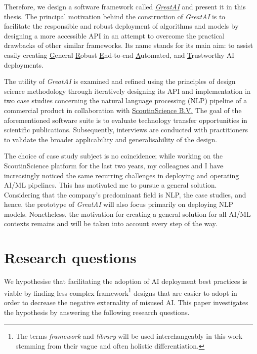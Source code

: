 Therefore, we design a software framework called \href{https://github.com/schmelczer/great-ai}{\textit{GreatAI}} and present it in this thesis. The principal motivation behind the construction of \textit{GreatAI} is to facilitate the responsible and robust deployment of algorithms and models by designing a more accessible API in an attempt to overcome the practical drawbacks of other similar frameworks. Its name stands for its main aim: to assist easily creating \underline{G}eneral \underline{R}obust \underline{E}nd-to-end \underline{A}utomated, and \underline{T}rustworthy AI deployments.

The utility of \textit{GreatAI} is examined and refined using the principles of design science methodology \cite{wieringa2014design} through iteratively designing its API and implementation in two case studies concerning the natural language processing (NLP) pipeline of a commercial product in collaboration with \href{https://scoutinscience.com/}{ScoutinScience B.V.} The goal of the aforementioned software suite is to evaluate technology transfer opportunities in scientific publications. Subsequently, interviews are conducted with practitioners to validate the broader applicability and generalisability of the design.

The choice of case study subject is no coincidence; while working on the ScoutinScience platform for the last two years, my colleagues and I have increasingly noticed the same recurring challenges in deploying and operating AI/ML pipelines. This has motivated me to pursue a general solution. Considering that the company's predominant field is NLP, the case studies, and hence, the prototype of \textit{GreatAI} will also focus primarily on deploying NLP models. Nonetheless, the motivation for creating a general solution for all AI/ML contexts remains and will be taken into account every step of the way.

\section{Research questions}

We hypothesise that facilitating the adoption of AI deployment best practices is viable by finding less complex framework\footnote{The terms \textit{framework} and \textit{library} will be used interchangeably in this work stemming from their vague and often holistic differentiation.} designs that are easier to adopt in order to decrease the negative externality of misused AI. This paper investigates the hypothesis by answering the following research questions. 

